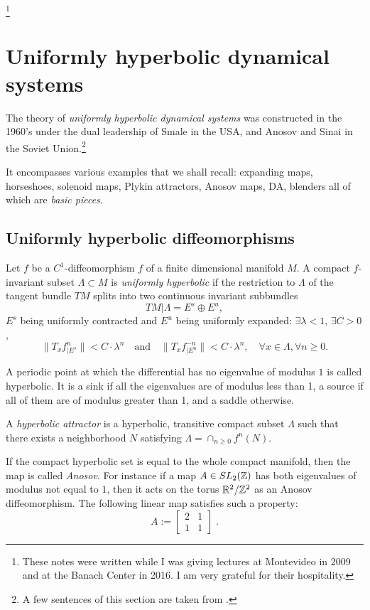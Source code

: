 \documentclass[11pt,openany,leqno]{article}
\begin{document}
\medskip
\thanks{These notes were written while I was giving lectures at Montevideo in 2009
and at the Banach Center in 2016. I am very grateful for their hospitality.
}
\section{Uniformly hyperbolic dynamical systems}\label{hyp:sec}
The theory of \emph{uniformly hyperbolic dynamical systems} was constructed in the 
1960's under the dual leadership of Smale in the USA, and Anosov and Sinai in the Soviet Union.\footnote{A few sentences of this section are taken from \cite{BY14}.}
\par
 It encompasses various examples that we shall recall: expanding maps, horseshoes, solenoid maps, Plykin attractors,  Anosov maps, DA, blenders all of which are \emph{basic pieces}. 

\subsection{Uniformly hyperbolic  diffeomorphisms}
 Let $f$ be a $C^1$-diffeomorphism $f$ of a finite dimensional manifold $M$. A compact $f$-invariant subset $\Lambda \subset M$ is 
\emph{uniformly hyperbolic} if the restriction to $\Lambda$ of the tangent bundle $TM$
splits into two continuous invariant subbundles
\[TM|\Lambda = E^s\oplus E^u,\]
$E^s$ being  uniformly contracted and $E^u$ being uniformly expanded: 
 $\exists \lambda<1$, $\exists C>0$,  
\[\|T_xf_{|E^s}^n\|<C\cdot\lambda^n\quad\mathrm{and} \quad \|T_xf_{|E^u}^{-n}\|<C\cdot\lambda^n, \quad \forall x\in \Lambda, \forall n\ge 0.\]


 





\begin{exam}
A periodic point at which the differential has no eigenvalue of modulus $1$ is called hyperbolic. It is a sink if all the eigenvalues are  of modulus less than 1, a source if all of them are of modulus greater than 1, and a saddle otherwise. 
\end{exam}

\begin{defi} A \emph{hyperbolic attractor}  is a hyperbolic, transitive compact subset $\Lambda$ such that there exists a neighborhood  $N$ satisfying $\Lambda = \cap_{n \geq 0} f^n(N)$.
\end{defi}
\begin{exam}[Anosov] If the compact hyperbolic set is equal to the whole compact manifold, then the map is called \emph{Anosov}. 
For instance if a map $A\in SL_2(\mathbb Z)$ has both eigenvalues of modulus not equal to $1$, then it acts on the torus $\mathbb R^2/\mathbb Z^2$ as an Anosov diffeomorphism. The following linear map satisfies such a property:  
\[A:= \left[\begin{array}{cc}
2&1\\
1&1\end{array}\right]\; .\]
\end{exam}
\end{document}
